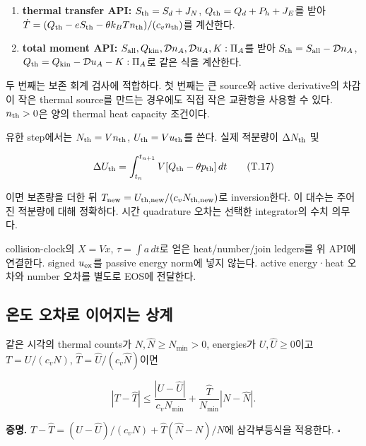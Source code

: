\begin{enumerate}
\def\labelenumi{\arabic{enumi}.}
\tightlist
\item
  \textbf{thermal transfer API:} \(S_{\rm th}=S_d+J_N\), \(Q_{\rm th}=Q_d+P_h+J_E\)를 받아 \(\dot T=(Q_{\rm th}-eS_{\rm th}-\theta k_BTn_{\rm th})/(c_vn_{\rm th})\)를 계산한다.
\item
  \textbf{total moment API:} \(S_{\rm all},Q_{\rm kin},\mathcal Dn_A,\mathcal Du_A,K:\Pi_A\)를 받아 \(S_{\rm th}=S_{\rm all}-\mathcal Dn_A\), \(Q_{\rm th}=Q_{\rm kin}-\mathcal Du_A-K:\Pi_A\)로 같은 식을 계산한다.
\end{enumerate}

두 번째는 보존 회계 검사에 적합하다. 첫 번째는 큰 source와 active derivative의 차감이 작은 thermal source를 만드는 경우에도 직접 작은 교환항을 사용할 수 있다. \(n_{\rm th}>0\)은 양의 thermal heat capacity 조건이다.

유한 step에서는 \(N_{\rm th}=Vn_{\rm th}\), \(U_{\rm th}=Vu_{\rm th}\)를 쓴다. 실제 적분량이 \(\Delta N_{\rm th}\) 및

\[
\Delta U_{\rm th}
=\int_{t_n}^{t_{n+1}}V[Q_{\rm th}-\theta p_{\rm th}]\,dt
\tag{T.17}
\]

이면 보존량을 더한 뒤 \(T_{\rm new}=U_{\rm th,new}/(c_vN_{\rm th,new})\)로 inversion한다. 이 대수는 주어진 적분량에 대해 정확하다. 시간 quadrature 오차는 선택한 integrator의 수치 의무다.

collision-clock의 \(X=Vx\), \(\tau=\int a\,dt\)로 얻은 heat/number/join ledgers를 위 API에 연결한다. signed \(u_{\rm ex}\)를 passive energy norm에 넣지 않는다. active energy·heat 오차와 number 오차를 별도로 EOS에 전달한다.

\hypertarget{uxc628uxb3c4-uxc624uxcc28uxb85c-uxc774uxc5b4uxc9c0uxb294-uxc0c1uxacc4}{%
\subsection{온도 오차로 이어지는 상계}\label{uxc628uxb3c4-uxc624uxcc28uxb85c-uxc774uxc5b4uxc9c0uxb294-uxc0c1uxacc4}}

같은 시각의 thermal counts가 \(N,\widehat N\ge N_{\min}>0\), energies가 \(U,\widehat U\ge0\)이고 \(T=U/(c_vN)\), \(\widehat T=\widehat U/(c_v\widehat N)\)이면

\[
\boxed{|T-\widehat T|
\le\frac{|U-\widehat U|}{c_vN_{\min}}
+\frac{\widehat T}{N_{\min}}|N-\widehat N|.}
\tag{T.18}
\]

\textbf{증명.} \(T-\widehat T=(U-\widehat U)/(c_vN) +\widehat T(\widehat N-N)/N\)에 삼각부등식을 적용한다. \(\square\)

